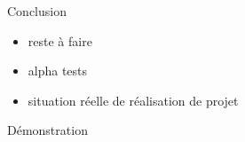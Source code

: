 \documentclass{beamer}
\begin{document}
\begin{frame}
Conclusion
\begin{itemize}

\item reste à faire
\item alpha tests
\item situation réelle de réalisation de projet
\end{itemize}
\end{frame}

\begin{frame}
\begin{center}
\huge{Démonstration}
\end{center}
\end{frame}

\end{document}
